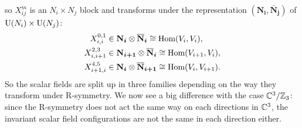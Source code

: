         so $X^m_{ij}$ is an $N_i\times N_j$ block and transforms under the representation $(\boldsymbol{\textbf{N}_i},\boldsymbol{\bar{\textbf{N}}_j})$ of $\text{U}(N_i)\times\text{U}(N_j)$:
        \begin{align}
            X^{0,1}_{i,i} &\in \boldsymbol{\textbf{N}_i}\otimes\boldsymbol{\overline{\textbf{N}}_i} \cong \text{Hom}(V_i,V_i),\label{eq:N2Znrepr1}\\
            X^{2,3}_{i,i+1} &\in \boldsymbol{\textbf{N}_{i+1}}\otimes\boldsymbol{\overline{\textbf{N}}_i} \cong \text{Hom}(V_{i+1},V_i),\label{eq:N2Znrepr2}\\
            X^{4,5}_{i+1,i} &\in \boldsymbol{\textbf{N}_i}\otimes\boldsymbol{\overline{\textbf{N}}_{i+1}} \cong \text{Hom}(V_i,V_{i+1}).\label{eq:N2Znrepr3}
        \end{align}
        So the scalar fields are split up in three families depending on the way they transform under R-symmetry. We now see a big difference with the case $\mathbb{C}^3/\mathbb{Z}_3$: since the R-symmetry does not act the same way on each directions in $\mathbb{C}^3$, the invariant scalar field configurations are not the same in each direction either.


